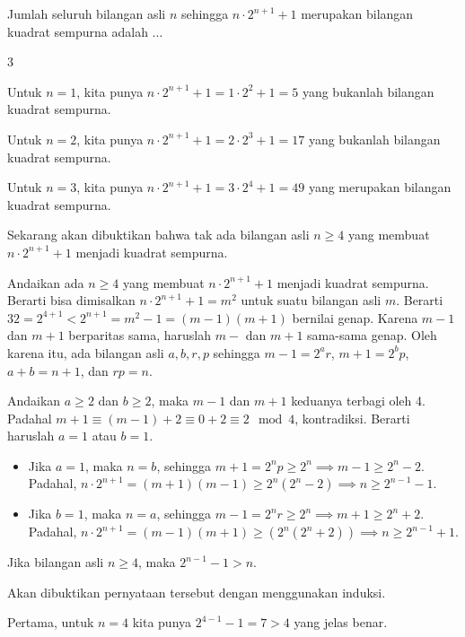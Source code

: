\documentclass[11pt]{scrartcl}
\begin{document}
	\begin{soalbaru}
		Jumlah seluruh bilangan asli $n$ sehingga $n\cdot 2^{n+1}+1$ merupakan bilangan kuadrat sempurna adalah $\dots$
		
		\begin{jawaban}
		3
		\end{jawaban}
		\begin{solusi}
			Untuk $n=1$, kita punya $n\cdot2^{n+1}+1=1\cdot2^2+1=5$ yang bukanlah bilangan kuadrat sempurna.
			
			Untuk $n=2$, kita punya $n\cdot2^{n+1}+1=2\cdot2^3+1=17$ yang bukanlah bilangan kuadrat sempurna. 
			
			Untuk $n=3$, kita punya $n\cdot2^{n+1}+1=3\cdot2^4+1=49$ yang merupakan bilangan kuadrat sempurna.
			
			Sekarang akan dibuktikan bahwa tak ada bilangan asli $n \ge 4$ yang membuat $n\cdot2^{n+1}+1$ menjadi kuadrat sempurna.
			
			Andaikan ada $n \ge 4$ yang membuat $n\cdot2^{n+1}+1$ menjadi kuadrat sempurna. Berarti bisa dimisalkan $n\cdot2^{n+1}+1=m^2$ untuk suatu bilangan asli $m$. Berarti $32=2^{4+1}<2^{n+1} = m^2-1=(m-1)(m+1)$ bernilai genap. Karena $m-1$ dan $m+1$ berparitas sama, haruslah $m-$ dan $m+1$ sama-sama genap. Oleh karena itu, ada bilangan asli $a,b,r,p$ sehingga $m-1 = 2^a r$, $m+1=2^b p$, $a+b=n+1$, dan $rp=n$.
			
			Andaikan $a \ge 2$ dan $b \ge 2$, maka $m-1$ dan $m+1$ keduanya terbagi oleh 4. Padahal $m+1 \equiv (m-1)+2 \equiv 0 + 2 \equiv 2 \mod 4$, kontradiksi. Berarti haruslah $a = 1$ atau $b=1$.
			
			\begin{itemize}
			\item Jika $a=1$, maka $n=b$, sehingga $m+1=2^np \ge 2^n \implies m-1 \ge 2^n-2$. Padahal, $n\cdot 2^{n+1} = (m+1)(m-1) \ge 2^n(2^n-2)  \implies n \ge 2^{n-1}-1.$
			
			\item Jika $b=1$, maka $n=a$, sehingga $m-1=2^nr \ge 2^n \implies m+1 \ge 2^n+2$. Padahal, $n\cdot 2^{n+1} = (m-1)(m+1) \ge (2^n(2^n+2))  \implies n \ge 2^{n-1}+1.$
			\end{itemize}
			
			\begin{lemmarev}
			Jika bilangan asli $n \ge 4$, maka $2^{n-1}-1 > n$.
			\begin{buktilemma}
			Akan dibuktikan pernyataan tersebut dengan menggunakan induksi.
			
			Pertama, untuk $n=4$ kita punya $2^{4-1}-1=7 > 4$ yang jelas benar.
			

\end{buktilemma}
\end{lemmarev}
\end{solusi}
\end{soalbaru}
\end{document}
